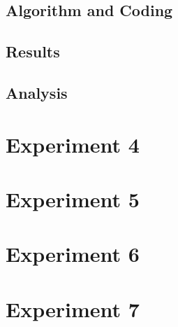 \subsection{Algorithm and Coding}\label{subsec:algAndCoding3}
\subsection{Results}\label{subsec:results3}
\subsection{Analysis}\label{subsec:analysis3}

\section{Experiment 4} \label{sec:experiment4}

\section{Experiment 5} \label{sec:experiment5}

\section{Experiment 6} \label{sec:experiment6}

\section{Experiment 7} \label{sec:experiment7}
